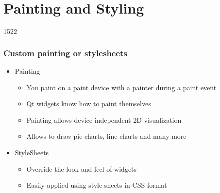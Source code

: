 %
%
%
%

\section{Painting and Styling}

\begin{slide}{1522}\frametitle{Custom painting or stylesheets}
  \begin{itemize}
  \item Painting
    \begin{itemize}
    \item You paint on a paint device with a painter during a paint event
    \item Qt widgets know how to paint themselves
    \item Painting allows device independent 2D visualization
    \item Allows to draw pie charts, line charts and many more
    \end{itemize}
  \item StyleSheets
    \begin{itemize}
    \item Override the look and feel of widgets
    \item Easily applied using style sheets in CSS format
    \end{itemize}
  \end{itemize}
\end{slide}

